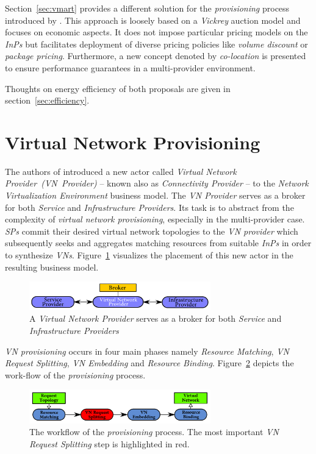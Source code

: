 \documentclass[prodmode,acmtomccap]{acmlarge}
\begin{document}
Section~\ref{sec:vmart} provides a different solution for the \emph{provisioning} process introduced by .
This approach is loosely based on a \emph{Vickrey} auction model and focuses on economic aspects. It does not impose particular pricing models on the \emph{InPs} but facilitates
deployment of diverse pricing policies like \emph{volume discount} or \emph{package pricing}. Furthermore, a new concept denoted by \emph{co-location} is presented
to ensure performance guarantees in a multi-provider environment.

Thoughts on energy efficiency of both proposals are given in section~\ref{sec:efficiency}.


\section{Virtual Network Provisioning}
\label{sec:provisioning}
The authors of  introduced a new actor called \emph{Virtual Network Provider~(VN~Provider)} -- known also as \emph{Connectivity Provider} -- 
to the \emph{Network Virtualization Environment} business model. The \emph{VN Provider} serves as a broker for both \emph{Service} and \emph{Infrastructure Providers}.
Its task is to abstract from the complexity of \emph{virtual network provisioning}, especially in the multi-provider case. \emph{SPs} commit their desired virtual network topologies
to the \emph{VN provider} which subsequently seeks and aggregates matching resources from suitable \emph{InPs} in order to synthesize \emph{VNs}.
Figure~\ref{fig2} visualizes the placement of this new actor in the resulting business model.

\begin{figure}[htb]
	\centering
	\includegraphics[width=0.7\textwidth]{broker}
	\caption{A \emph{Virtual Network Provider} serves as a broker for  both \emph{Service} and \emph{Infrastructure Providers}}
	\label{fig2}
\end{figure}

\emph{VN provisioning} occurs in four main phases namely \emph{Resource Matching}, \emph{VN Request Splitting}, \emph{VN Embedding} and \emph{Resource Binding}.
Figure~\ref{fig3} depicts the work-flow of the \emph{provisioning} process.

\begin{figure}[htb]
	\centering
	\includegraphics[width=0.7\textwidth]{provisioning2}
	\caption{The workflow of the \emph{provisioning} process. The most important \emph{VN Request Splitting} step is highlighted in red.}
	\label{fig3}
\end{figure}
\end{document}
